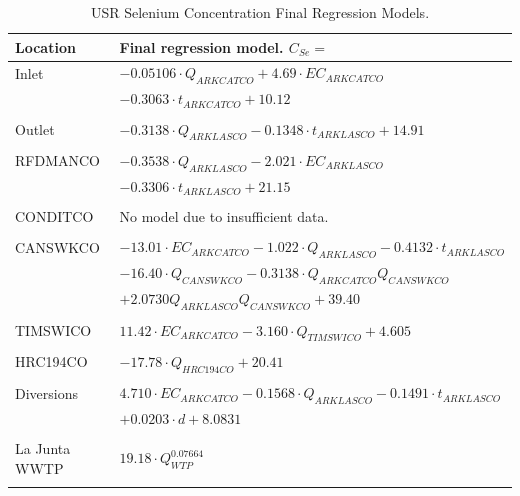 \begin{linenumbers}
\begin{table}[htbp]
\centering
\caption{USR Selenium Concentration Final Regression Models.}
\label{tab:USRFinalRegression}
\begin{tabular}{ll}
	\toprule
	Location		& Final regression model. $C_{Se}=$\\
	\midrule
	\midrule
	Inlet		& $-0.05106 \cdot Q_{ARKCATCO} + 4.69 \cdot EC_{ARKCATCO}$\\
					& $ -0.3063 \cdot t_{ARKCATCO} + 10.12$ \\
	\\
	Outlet		& $-0.3138 \cdot Q_{ARKLASCO} -0.1348 \cdot t_{ARKLASCO} + 14.91$\\
	\\	
	RFDMANCO		& $-0.3538 \cdot Q_{ARKLASCO} -2.021 \cdot EC_{ARKLASCO}$\\
					& $ -0.3306 \cdot t_{ARKLASCO} + 21.15$\\
	\\
	CONDITCO		& No model due to insufficient data.\\
	\\	
	CANSWKCO		& $ -13.01 \cdot EC_{ARKCATCO} -1.022 \cdot Q_{ARKLASCO}-0.4132 \cdot t_{ARKLASCO}$\\ 
					& $ -16.40 \cdot Q_{CANSWKCO}-0.3138 \cdot Q_{ARKCATCO}Q_{CANSWKCO}$\\
					& $+2.0730 Q_{ARKLASCO}Q_{CANSWKCO} + 39.40$\\
	\\
	TIMSWICO		& $11.42 \cdot EC_{ARKCATCO} -3.160 \cdot Q_{TIMSWICO} + 4.605$\\
	\\
	HRC194CO		& $-17.78 \cdot Q_{HRC194CO} + 20.41$\\
	\\	
	Diversions		& $4.710 \cdot EC_{ARKCATCO} -0.1568 \cdot Q_{ARKLASCO}-0.1491 \cdot t_{ARKLASCO}$\\
					& $+0.0203 \cdot d + 8.0831$\\
	\\	
	La Junta WWTP	& $19.18 \cdot Q_{WTP}^{0.07664}$\\
	\bottomrule \\
\end{tabular}
\end{table}


\end{linenumbers}

